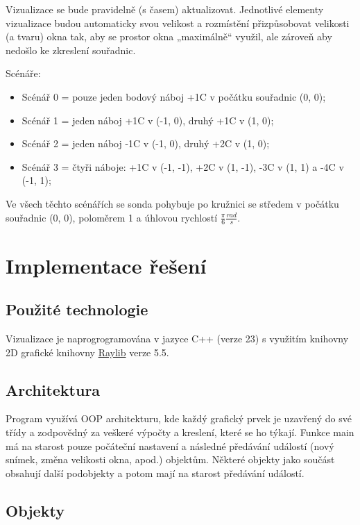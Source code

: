 \documentclass[12pt]{article}
\begin{document}
Vizualizace se bude pravidelně (s časem) aktualizovat. Jednotlivé elementy
vizualizace budou automaticky svou velikost a rozmístění přizpůsobovat velikosti
(a tvaru) okna tak, aby se prostor okna „maximálně“ využil, ale zároveň aby
nedošlo ke zkreslení souřadnic.

Scénáře:

\begin{itemize}
  \item Scénář 0 = pouze jeden bodový náboj +1C v počátku souřadnic (0, 0);
  \item Scénář 1 = jeden náboj +1C v (-1, 0), druhý +1C v (1, 0);
  \item Scénář 2 = jeden náboj -1C v (-1, 0), druhý +2C v (1, 0);
  \item Scénář 3 = čtyři náboje: +1C v (-1, -1), +2C v (1, -1), -3C v (1, 1)
    a -4C v (-1, 1);
\end{itemize}

Ve všech těchto scénářích se sonda pohybuje po kružnici se středem v počátku
souřadnic (0, 0), poloměrem 1 a úhlovou rychlostí \( \frac{\pi}{6} \frac{rad}{s} \).

\section{Implementace řešení}

\subsection{Použité technologie}

Vizualizace je naprogrogramována v jazyce C++ (verze 23) s využitím knihovny 2D
grafické knihovny \href{https://www.raylib.com/}{Raylib} verze 5.5.


\subsection{Architektura}

Program využívá OOP architekturu, kde každý grafický prvek je uzavřený do své
třídy a zodpovědný za veškeré výpočty a kreslení, které se ho týkají. Funkce
main má na starost pouze počáteční nastavení a následné předávání událostí
(nový snímek, změna velikosti okna, apod.) objektům. Některé objekty jako
součást obsahují další podobjekty a potom mají na starost předávání událostí.

\subsection{Objekty}
\end{document}
